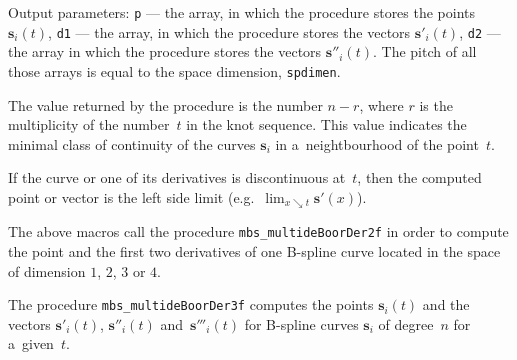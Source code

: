 Output parameters: \texttt{p} --- the array, in which the procedure
stores the points $\bm{s}_i(t)$, \texttt{d1} --- the array, in which the
procedure stores the vectors $\bm{s}'_i(t)$, \texttt{d2} --- the array
in which the procedure stores the vectors $\bm{s}''_i(t)$.
The pitch of all those arrays is equal to the space dimension,
 \texttt{spdimen}.

The value returned by the procedure is the number $n-r$, where $r$ is the
multiplicity of the number~$t$ in the knot sequence. This value
indicates the minimal class of continuity of the curves
$\bm{s}_i$ in a~neightbourhood of the point~$t$.

If the curve or one of its derivatives is discontinuous at~$t$,
then the computed point or vector is the left side limit
(e.g.\ $\lim_{x\searrow t}\bm{s}'(x)$).

\vspace{\bigskipamount}
\begin{sloppypar}
The above macros call the procedure \texttt{mbs\_multideBoorDer2f}
in order to compute the point and the first two derivatives of
one B-spline curve located in the space of dimension $1$, $2$, $3$ or $4$.
\end{sloppypar}

\vspace{\bigskipamount}
\begin{sloppypar}
The procedure \texttt{mbs\_multideBoorDer3f} computes the points $\bm{s}_i(t)$
and the vectors $\bm{s}'_i(t)$, $\bm{s}''_i(t)$ and~$\bm{s}'''_i(t)$
for B-spline curves $\bm{s}_i$ of degree~$n$ for a~given~$t$.
\end{sloppypar}


